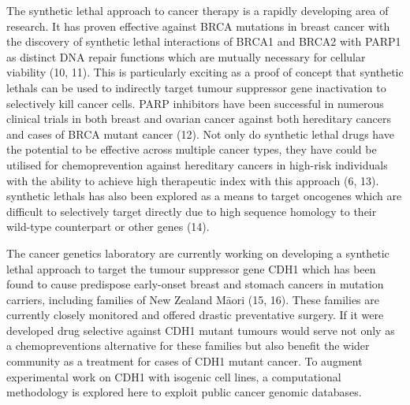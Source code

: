 The \gls{synthetic lethal} approach to cancer therapy is a rapidly developing area of research. It has proven effective against BRCA \glspl{mutation} in breast cancer with the discovery of \gls{synthetic lethal} interactions of BRCA1 and BRCA2 with PARP1 as distinct \acrshort{DNA} repair functions which are mutually necessary for cellular viability (10, 11). This is particularly exciting as a proof of concept that \glspl{synthetic lethal} can be used to indirectly target \gls{tumour suppressor} gene inactivation to selectively kill cancer cells. \gls{PARP} inhibitors have been successful in numerous clinical trials in both breast and ovarian cancer against both \gls{hereditary} cancers and  cases of BRCA \gls{mutant} cancer (12). Not only do \gls{synthetic lethal} drugs have the potential to be effective across multiple cancer types, they have could be utilised for \gls{chemoprevention} against \gls{hereditary} cancers in high-risk individuals with the ability to achieve high therapeutic index with this approach (6, 13). \Glspl{synthetic lethal} has also been explored as a means to target \glspl{oncogene} which are difficult to selectively target directly due to high sequence homology to their \gls{wild-type} counterpart or other genes (14).

The cancer genetics laboratory are currently working on developing a \gls{synthetic lethal} approach to target the \gls{tumour suppressor} gene CDH1 which has been found to cause predispose early-onset breast and stomach cancers in \gls{mutation} carriers, including families of New Zealand M\={a}ori (15, 16). These families are currently closely monitored and offered drastic preventative surgery. If it were developed drug selective against CDH1 \gls{mutant} \glspl{tumour} would serve not only as a \glspl{chemoprevention} alternative for these families but also benefit the wider community as a treatment for  cases of CDH1 \gls{mutant} cancer. To augment experimental work on CDH1 with isogenic cell lines, a computational methodology is explored here to exploit public cancer \gls{genomic} databases.


